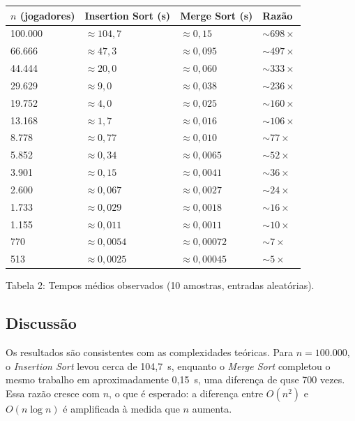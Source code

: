 \documentclass[11pt,a4paper]{article}
\begin{document}
\begin{center}
\begin{tabular}{R{2.8cm} R{3.2cm} R{3.2cm} R{2.4cm}}
  \toprule
  \textbf{$n$ (jogadores)} & \textbf{Insertion Sort (s)} & \textbf{Merge Sort (s)} & \textbf{Razão} \\
   & $\approx 104{,}7$    & $\approx 0{,}15$  & ${\sim}698\times$ \\
   66.666 & $\approx 47{,}3$    & $\approx 0{,}095$  & ${\sim}497\times$ \\
   44.444 & $\approx 20{,}0$    & $\approx 0{,}060$  & ${\sim}333\times$ \\
   29.629 & $\approx 9{,}0$     & $\approx 0{,}038$  & ${\sim}236\times$ \\
   19.752 & $\approx 4{,}0$     & $\approx 0{,}025$  & ${\sim}160\times$ \\
   13.168 & $\approx 1{,}7$     & $\approx 0{,}016$  & ${\sim}106\times$ \\
    8.778 & $\approx 0{,}77$    & $\approx 0{,}010$  & ${\sim}77\times$  \\
    5.852 & $\approx 0{,}34$    & $\approx 0{,}0065$  & ${\sim}52\times$  \\
    3.901 & $\approx 0{,}15$    & $\approx 0{,}0041$  & ${\sim}36\times$  \\
    2.600 & $\approx 0{,}067$   & $\approx 0{,}0027$  & ${\sim}24\times$  \\
    1.733 & $\approx 0{,}029$   & $\approx 0{,}0018$  &
    ${\sim}16\times$ \\
    1.155 & $\approx 0{,}011$   & $\approx 0{,}0011$  & ${\sim}10\times$  \\
     770 & $\approx 0{,}0054$   & $\approx 0{,}00072$ &
     ${\sim}7\times$ \\
     513 & $\approx 0{,}0025$  & $\approx 0{,}00045$ & ${\sim}5\times$   \\
  \bottomrule
\end{tabular}
 
\small Tabela 2: Tempos médios observados (10 amostras, entradas aleatórias).
\end{center}
 
\subsection{Discussão}
 
Os resultados são consistentes com as complexidades teóricas. Para $n = 100.000$, o \textit{Insertion Sort} levou cerca de 104,7~s, enquanto o \textit{Merge Sort} completou o mesmo trabalho em aproximadamente 0,15~s, uma diferença de quse 700 vezes. Essa razão cresce com $n$, o que é esperado: a diferença entre $O(n^2)$ e $O(n \log n)$ é amplificada à medida que
$n$ aumenta. 
\end{document}

